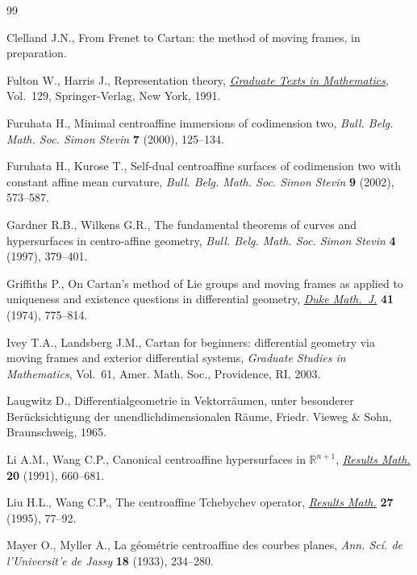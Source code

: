 \documentclass[pdftex]{sigma}
\numberwithin{equation}{section}
\theoremstyle{definition}
\begin{document}
\begin{thebibliography}{99}
\footnotesize \itemsep=0pt

Clelland J.N., From {F}renet to {C}artan: the method of moving frames, in
  preparation.

Fulton W., Harris J., Representation theory, \href{http://dx.doi.org/10.1007/978-1-4612-0979-9}{\textit{Graduate Texts in
  Mathematics}}, Vol.~129, Springer-Verlag, New York, 1991.

Furuhata H., Minimal centroaffine immersions of codimension two, \textit{Bull.
  Belg. Math. Soc. Simon Stevin} \textbf{7} (2000), 125--134.

Furuhata H., Kurose T., Self-dual centroaffine surfaces of codimension two with
  constant affine mean curvature, \textit{Bull. Belg. Math. Soc. Simon Stevin}
  \textbf{9} (2002), 573--587.

Gardner R.B., Wilkens G.R., The fundamental theorems of curves and
  hypersurfaces in centro-affine geo\-met\-ry, \textit{Bull. Belg. Math. Soc. Simon
  Stevin} \textbf{4} (1997), 379--401.

Griffiths P., On {C}artan's method of {L}ie groups and moving frames as applied
  to uniqueness and existence questions in differential geometry, \href{http://dx.doi.org/10.1215/S0012-7094-74-04180-5}{\textit{Duke
  Math.~J.}} \textbf{41} (1974), 775--814.

Ivey T.A., Landsberg J.M., Cartan for beginners: differential geometry via
  moving frames and exterior differential systems, \textit{Graduate Studies in
  Mathematics}, Vol.~61, Amer. Math. Soc., Providence, RI, 2003.

Laugwitz D., Differentialgeometrie in {V}ektorr\"aumen, unter besonderer
  {B}er\"ucksichtigung der unendlichdimensionalen {R}\"aume, Friedr. Vieweg \&
  Sohn, Braunschweig, 1965.

Li A.M., Wang C.P., Canonical centroaffine hypersurfaces in {${\mathbb
  R}^{n+1}$}, \href{http://dx.doi.org/10.1007/BF03323203}{\textit{Results Math.}} \textbf{20} (1991), 660--681.

Liu H.L., Wang C.P., The centroaffine {T}chebychev operator, \href{http://dx.doi.org/10.1007/BF03322271}{\textit{Results
  Math.}} \textbf{27} (1995), 77--92.

Mayer O., Myller A., La g\'eom\'etrie centroaffine des courbes planes,
  \textit{Ann. {S}c\'i. de l'{U}niversit'e de {J}assy} \textbf{18} (1933),
  234--280.


\end{thebibliography}
\end{document}
